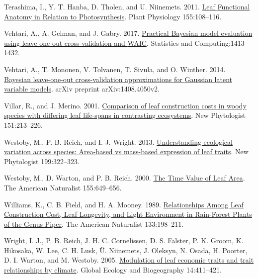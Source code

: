 \documentclass[
  12pt,
  a4paper,
,tablecaptionabove
]{scrartcl}
\newlength{\cslhangindent}
\newenvironment{CSLReferences}[2] %
 {%
  \setlength{\parindent}{0pt}
  \ifodd #1 \everypar{\setlength{\hangindent}{\cslhangindent}}\ignorespaces\fi
  \ifnum #2 > 0
  \setlength{\parskip}{#2\baselineskip}
  \fi
 }%
 {}
\begin{document}
\begin{CSLReferences}{1}{0}
\leavevmode{}%
Terashima, I., Y. T. Hanba, D. Tholen, and U. Niinemets. 2011. \href{https://doi.org/10.1104/pp.110.165472}{Leaf {Functional Anatomy} in {Relation} to {Photosynthesis}}. Plant Physiology 155:108--116.

\leavevmode{}%
Vehtari, A., A. Gelman, and J. Gabry. 2017. \href{https://doi.org/10.1007/s11222-016-9696-4}{Practical {Bayesian} model evaluation using leave-one-out cross-validation and {WAIC}}. Statistics and Computing:1413--1432.

\leavevmode{}%
Vehtari, A., T. Mononen, V. Tolvanen, T. Sivula, and O. Winther. 2014. \href{https://arxiv.org/abs/1408.4050v2}{Bayesian leave-one-out cross-validation approximations for {Gaussian} latent variable models}. arXiv preprint arXiv:1408.4050v2.

\leavevmode{}%
Villar, R., and J. Merino. 2001. \href{https://doi.org/10.1046/j.1469-8137.2001.00147.x}{Comparison of leaf construction costs in woody species with differing leaf life-spans in contrasting ecosystems}. New Phytologist 151:213--226.

\leavevmode{}%
Westoby, M., P. B. Reich, and I. J. Wright. 2013. \href{https://doi.org/10.1111/nph.12345}{Understanding ecological variation across species: {Area-based} vs mass-based expression of leaf traits}. New Phytologist 199:322--323.

\leavevmode{}%
Westoby, M., D. Warton, and P. B. Reich. 2000. \href{https://doi.org/10.1086/303346}{The {Time Value} of {Leaf Area}}. The American Naturalist 155:649--656.

\leavevmode{}%
Williams, K., C. B. Field, and H. A. Mooney. 1989. \href{https://doi.org/10.1086/284910}{Relationships {Among Leaf Construction Cost}, {Leaf Longevity}, and {Light Environment} in {Rain-Forest Plants} of the {Genus Piper}}. The American Naturalist 133:198--211.

\leavevmode{}%
Wright, I. J., P. B. Reich, J. H. C. Cornelissen, D. S. Falster, P. K. Groom, K. Hikosaka, W. Lee, C. H. Lusk, Ü. Niinemets, J. Oleksyn, N. Osada, H. Poorter, D. I. Warton, and M. Westoby. 2005. \href{https://doi.org/10.1111/j.1466-822x.2005.00172.x}{Modulation of leaf economic traits and trait relationships by climate}. Global Ecology and Biogeography 14:411--421.


\end{CSLReferences}
\end{document}
